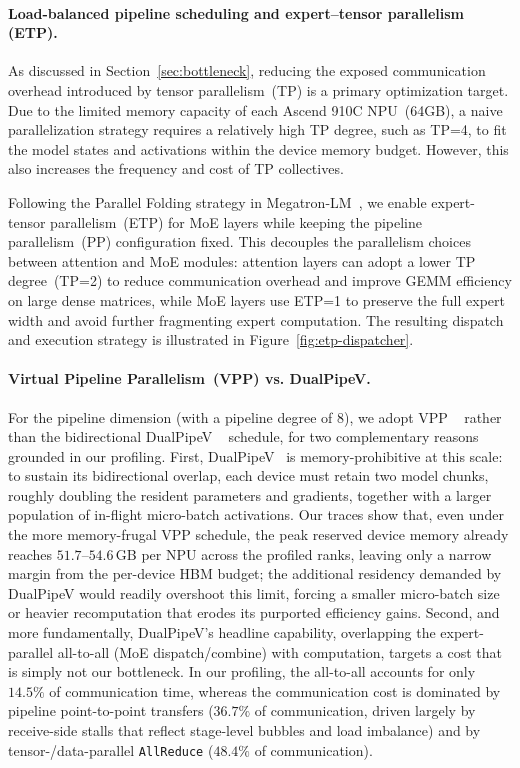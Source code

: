 \paragraph{Load-balanced pipeline scheduling and expert--tensor parallelism (ETP).}
\label{subsec:etp}
As discussed in Section~\ref{sec:bottleneck}, reducing the exposed communication overhead introduced by tensor parallelism~(TP) is a primary optimization target. Due to the limited memory capacity of each Ascend 910C NPU~(64GB), a naive parallelization strategy requires a relatively high TP degree, such as TP=4, to fit the model states and activations within the device memory budget. However, this also increases the frequency and cost of TP collectives.

Following the Parallel Folding strategy in Megatron-LM~\citep{shoeybi2019megatron}, we enable expert-tensor parallelism~(ETP) for MoE layers while keeping the pipeline parallelism~(PP) configuration fixed. This decouples the parallelism choices between attention and MoE modules: attention layers can adopt a lower TP degree~(TP=2) to reduce communication overhead and improve GEMM efficiency on large dense matrices, while MoE layers use ETP=1 to preserve the full expert width and avoid further fragmenting expert computation. The resulting dispatch and execution strategy is illustrated in Figure~\ref{fig:etp-dispatcher}.

\paragraph{Virtual Pipeline Parallelism~(VPP) vs. DualPipeV.}
For the pipeline dimension (with a pipeline degree of $8$), we adopt VPP ~\citep{narayanan2021efficient} rather than the bidirectional DualPipeV ~\citep{qi2025dual,deepseekai2025deepseekv3technicalreport} schedule, for two complementary reasons grounded in our profiling.
First, DualPipeV~\citep{qi2025dual,deepseekai2025deepseekv3technicalreport} is memory-prohibitive at this scale: to sustain its bidirectional overlap, each device must retain two model chunks, roughly doubling the resident parameters and gradients, together with a larger population of in-flight micro-batch activations.
Our traces show that, even under the more memory-frugal VPP schedule, the peak reserved device memory already reaches $51.7$--$54.6$\,GB per NPU across the profiled ranks, leaving only a narrow margin from the per-device HBM budget; the additional residency demanded by DualPipeV would readily overshoot this limit, forcing a smaller micro-batch size or heavier recomputation that erodes its purported efficiency gains.
Second, and more fundamentally, DualPipeV's headline capability, overlapping the expert-parallel all-to-all (MoE dispatch/combine) with computation, targets a cost that is simply not our bottleneck.
In our profiling, the all-to-all accounts for only $14.5\%$ of communication time, whereas the communication cost is dominated by pipeline point-to-point transfers ($36.7\%$ of communication, driven largely by receive-side stalls that reflect stage-level bubbles and load imbalance) and by tensor-/data-parallel \texttt{AllReduce} ($48.4\%$ of communication).

